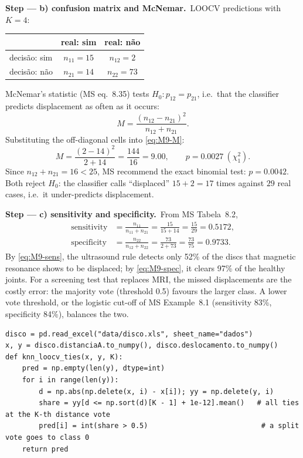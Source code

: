 \documentclass[11pt,a4paper]{article}
\numberwithin{equation}{questao}   %
\newcommand{\passo}[2]{\par\smallskip\noindent\textbf{Step --- #1.}~#2}
\begin{document}
\begin{sol}
\passo{b) confusion matrix and McNemar}{LOOCV predictions with $K=4$:
\begin{center}\begin{tabular}{lcc}\toprule
 & real: sim & real: não\\\midrule
decisão: sim & $n_{11}=15$ & $n_{12}=2$\\
decisão: não & $n_{21}=14$ & $n_{22}=73$\\\bottomrule\end{tabular}\end{center}
McNemar's statistic (MS eq.~8.35) tests $H_0\colon p_{12}=p_{21}$, i.e.\ that the classifier
predicts displacement as often as it occurs:
\begin{equation}\label{eq:M9-M}
M=\frac{(n_{12}-n_{21})^2}{n_{12}+n_{21}} .
\end{equation}
Substituting the off-diagonal cells into \eqref{eq:M9-M}:
\begin{equation}\label{eq:M9-Mnum}
M=\frac{(2-14)^2}{2+14}=\frac{144}{16}=9.00,\qquad p=0.0027\ (\chi^2_1).
\end{equation}
Since $n_{12}+n_{21}=16<25$, MS recommend the exact binomial test: $p=0.0042$. Both reject $H_0$:
the classifier calls ``displaced'' $15+2=17$ times against $29$ real cases, i.e.\ it under-predicts displacement.}

\passo{c) sensitivity and specificity}{From MS Tabela~8.2,
\begin{align}
\text{sensitivity}&=\frac{n_{11}}{n_{11}+n_{21}}=\frac{15}{15+14}=\frac{15}{29}=0.5172,\label{eq:M9-sens}\\
\text{specificity}&=\frac{n_{22}}{n_{12}+n_{22}}=\frac{73}{2+73}=\frac{73}{75}=0.9733.\label{eq:M9-spec}
\end{align}
By \eqref{eq:M9-sens}, the ultrasound rule detects only 52\% of the discs that magnetic resonance
shows to be displaced; by \eqref{eq:M9-spec}, it clears 97\% of the healthy joints. For a screening
test that replaces MRI, the missed displacements are the costly error: the majority vote (threshold
0.5) favours the larger class. A lower vote threshold, or the logistic cut-off of MS Example~8.1
(sensitivity 83\%, specificity 84\%), balances the two.}

\begin{lstlisting}
disco = pd.read_excel("data/disco.xls", sheet_name="dados")
x, y = disco.distanciaA.to_numpy(), disco.deslocamento.to_numpy()
def knn_loocv_ties(x, y, K):
    pred = np.empty(len(y), dtype=int)
    for i in range(len(y)):
        d = np.abs(np.delete(x, i) - x[i]); yy = np.delete(y, i)
        share = yy[d <= np.sort(d)[K - 1] + 1e-12].mean()   # all ties at the K-th distance vote
        pred[i] = int(share > 0.5)                           # a split vote goes to class 0
    return pred
\end{lstlisting}


\end{sol}
\end{document}

